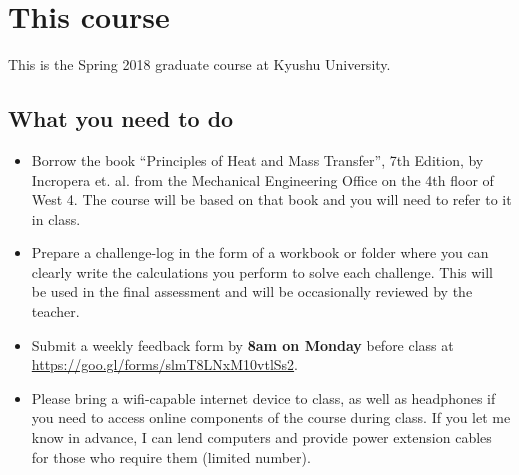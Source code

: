 \section{This course}
This is the Spring 2018 \course graduate course at Kyushu University.

\subsection{What you need to do}
\begin{itemize}
    \item Borrow the book ``Principles of Heat and Mass Transfer'', 7th Edition, by Incropera et. al. from the Mechanical Engineering Office on the 4th floor of West 4. The course will be based on that book and you will need to refer to it in class.
    \item Prepare a challenge-log in the form of a workbook or folder where you can clearly write the calculations you perform to solve each challenge. This will be used in the final assessment and will be occasionally reviewed by the teacher.
    \item Submit a weekly feedback form by \textbf{8am on Monday} before class at \url{https://goo.gl/forms/slmT8LNxM10vtlSs2}.
    \item Please bring a wifi-capable internet device to class, as well as headphones if you need to access online components of the course during class. If you let me know in advance, I can lend computers and provide power extension cables for those who require them (limited number).
\end{itemize}

